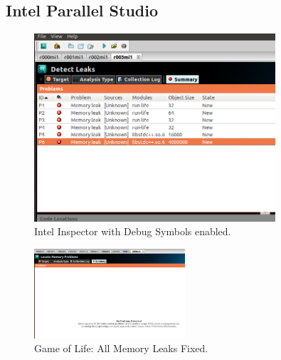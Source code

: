 \documentclass[10pt]{article}
\begin{document}
\begin{appendices}
\section{Intel Parallel Studio}
\label{sec:Intel-Tools}

\begin{figure}[h]
\begin{center}
\includegraphics[width=0.8\textwidth]{figures/fileMep7k0_Memory_Analysis.png}
\caption{Intel Inspector with Debug Symbols enabled.}
\label{fig:intentional_memory_leak}
\end{center}
\end{figure}

\begin{figure}[h]
\begin{center}
\includegraphics[width=0.5\textwidth]{figures/ChangeSet14_Memory.png}
\caption{Game of Life: All Memory Leaks Fixed.}
\label{fig:inspector_clean_memory}
\end{center}
\end{figure}


\end{appendices}
\end{document}
